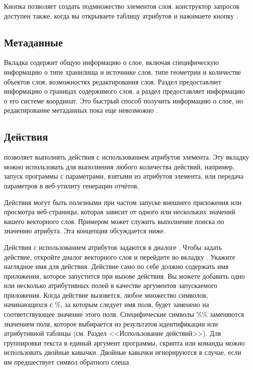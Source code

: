 Кнопка  позволяет создать подмножество
элементов слоя. конструктор запросов доступен также, когда вы
открываете таблицу атрибутов и нажимаете кнопку .

\subsection{Метаданные}

Вкладка  содержит общую информацию о слое, включая
специфическую информацию о типе хранилища и источнике слоя, типе
геометрии и количестве объектов слоя,  возможностях редактирования
слоя. Раздел  предоставляет
информацию о границах содержимого слоя, а раздел
 предоставляет информацию о его
системе координат. Это быстрый способ получить информацию о слое, но
редактирование метаданных пока еще невозможно .

\subsection{Действия}\label{label_actions}

\qg позволяет выполнять действия с использованием атрибутов элемента. Эту
вкладку можно использовать для выполнения любого количества действий, например,
запуск программы с параметрами, взятыми из атрибутов элемента, или передача
параметров в веб-утилиту генерации отчётов.

Действия могут быть полезными при частом запуске внешнего приложения или
просмотра веб-страницы, которая зависит от одного или нескольких значений
вашего векторного слоя. Примером может служить выполнение поиска по
значению атрибута. Эта концепция обсуждается ниже.


Действия с использованием атрибутов задаются в диалоге .
Чтобы задать действие, откройте диалог  векторного
слоя и перейдите во вкладку . Укажите наглядное имя для
действия. Действие само по себе должно содержать имя приложения, которое
запустится при вызове действия. Вы можете добавить одно или
несколько атрибутивных полей в качестве аргументов запускаемого приложения.
Когда действие вызовется, любое множество символов, начинающихся с \%, за
которым следует имя поля, будет заменено на соответствующее значение
этого поля. Специфические символы \%\% \index{\%\%} заменяются значением поля,
которое выбирается из результатов идентификации или атрибутивной таблицы
(см. Раздел <<Использование действий>>). Для группировки текста в
единый аргумент программы, скрипта или команды можно использовать двойные кавычки.
Двойные кавычки игнорируются в случае, если им предшествует символ обратного
слеша.

